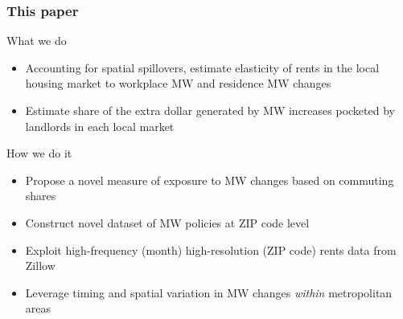 \documentclass[aspectratio=169, t]{beamer}
\begin{document}
\begin{frame}
    \frametitle{This paper}
    
    What we do
    \begin{itemize}
        \vspace{.5mm} \item Accounting for spatial spillovers, estimate 
        elasticity of rents in the local housing market to
         {\color{red} workplace MW} and {\color{blue} residence MW} changes
        \vspace{.5mm} \item Estimate share of the extra dollar generated by
        MW increases pocketed by landlords in each local market
    \end{itemize}
    
    \vspace{3mm}
    \pause
    How we do it
    \begin{itemize}
        \vspace{.5mm} \item Propose a novel measure of exposure to MW changes 
        based on commuting shares
        \vspace{.5mm} \item Construct novel dataset of MW policies at ZIP code level
        \vspace{.5mm} \item Exploit high-frequency (month) high-resolution 
        (ZIP code) rents data from Zillow
        \vspace{.5mm} \item Leverage timing and spatial variation in MW changes 
        \textit{within} metropolitan areas
    \end{itemize}
\end{frame}
\end{document}
